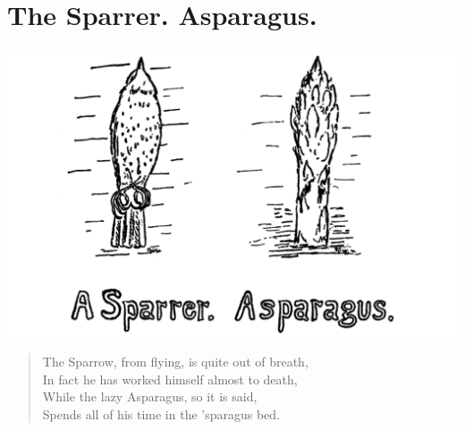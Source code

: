 \documentclass[letterpaper, 10pt, openany]{memoir}
\begin{document}
\chapter{The Sparrer. Asparagus.}
\includegraphics[width=1\textwidth]{f-p11.png}
\vspace{\onelineskip}
\begin{verse}\huge
The Sparrow, from flying, is quite out of breath,\\
In fact he has worked himself almost to death,\\
While the lazy Asparagus, so it is said,\\
Spends all of his time in the 'sparagus bed.\\
\end{verse}
\end{document}
